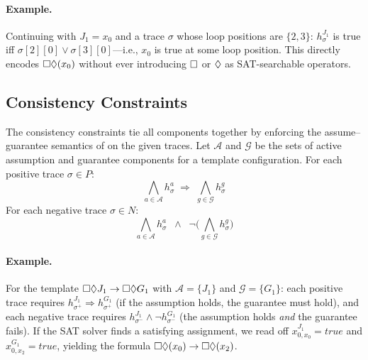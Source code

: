 \paragraph{Example.}
Continuing with $J_1 = x_0$ and a trace $\sigma$ whose loop
positions are $\{2, 3\}$: $h^{J_1}_\sigma$ is true iff
$\sigma[2][0] \lor \sigma[3][0]$---i.e., $x_0$ is true at some
loop position.
This directly encodes $\square\Diamond(x_0)$ without ever
introducing $\square$ or $\Diamond$ as SAT-searchable
operators.

\subsection{Consistency Constraints}\label{sec:consistency}

The consistency constraints tie all components together by enforcing
the assume--guarantee semantics of \GRone on the given traces.
Let $\mathcal{A}$ and $\mathcal{G}$ be the sets of active assumption
and guarantee components for a template configuration.
For each positive trace $\sigma \in P$:
\begin{equation}\label{eq:pos}
  \textstyle\bigwedge_{a \in \mathcal{A}} h^a_\sigma
  \;\Rightarrow\;
  \textstyle\bigwedge_{g \in \mathcal{G}} h^g_\sigma
\end{equation}
For each negative trace $\sigma \in N$:
\begin{equation}\label{eq:neg}
  \textstyle\bigwedge_{a \in \mathcal{A}} h^a_\sigma
  \;\;\land\;\;
  \lnot\bigl(\textstyle\bigwedge_{g \in \mathcal{G}} h^g_\sigma\bigr)
\end{equation}

\paragraph{Example.}
For the template $\square\Diamond J_1 \to \square\Diamond G_1$
with $\mathcal{A} = \{J_1\}$ and $\mathcal{G} = \{G_1\}$:
each positive trace requires
$h^{J_1}_{\sigma^+} \Rightarrow h^{G_1}_{\sigma^+}$
(if the assumption holds, the guarantee must hold), and
each negative trace requires
$h^{J_1}_{\sigma^-} \land \lnot h^{G_1}_{\sigma^-}$
(the assumption holds \emph{and} the guarantee fails).
If the SAT solver finds a satisfying assignment, we read off
$x^{J_1}_{0,x_0} = \mathit{true}$ and
$x^{G_1}_{0,x_2} = \mathit{true}$, yielding the formula
$\square\Diamond(x_0) \to \square\Diamond(x_2)$.
